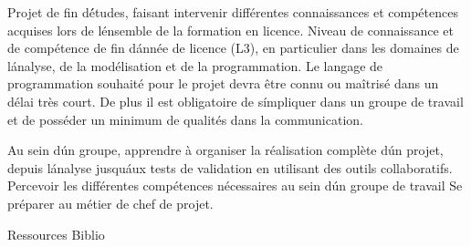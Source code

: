 {
Projet de fin d\'études, faisant intervenir différentes connaissances et compétences acquises lors de l\'ensemble de la formation en licence.
} 
{Niveau de connaissance et de compétence de fin d\'année de licence (L3), en particulier dans les domaines de l\'analyse, de la modélisation et de la programmation.
Le langage de programmation souhaité pour le projet devra être connu ou maîtrisé dans un délai très court.
De plus il est obligatoire de s\'impliquer dans un groupe de travail et de posséder un minimum de qualités dans la communication.
} 
{\begin{itemize} 
 \ObjItem Au sein d\'un groupe, apprendre à organiser la réalisation complète d\'un projet, depuis l\'analyse jusqu\'aux tests de validation en utilisant des outils collaboratifs. 
 \ObjItem Percevoir les différentes compétences nécessaires au sein d\'un groupe de travail Se préparer au métier de chef de projet. 
\end{itemize} 
} 
{Ressources} 
{Biblio} 
 
\vfill

